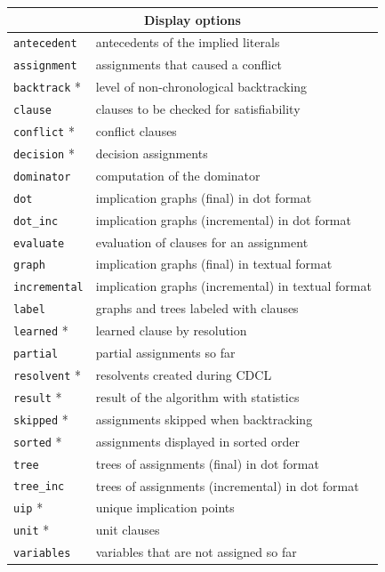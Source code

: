 \documentclass[11pt]{article}
\newcommand*{\p}[1]{\textup{\texttt{#1}}}
\begin{document}
\begin{center}
\begin{tabular}{|l|l|}
\hline
\multicolumn{2}{|c|}{\textbf{\large Display options}}\\
\hline
\p{antecedent}  &  antecedents of the implied literals\\
\p{assignment}  &  assignments that caused a conflict\\
\p{backtrack} * &  level of non-chronological backtracking\\
\p{clause}      &  clauses to be checked for satisfiability \\
\p{conflict} *  &  conflict clauses\\
\p{decision} *  &  decision assignments \\
\p{dominator}   &  computation of the dominator\\
\p{dot}         &  implication graphs (final) in dot format \\
\p{dot\_inc}    &  implication graphs (incremental) in dot format\\
\p{evaluate}    &  evaluation of clauses for an assignment\\
\p{graph}       &  implication graphs (final) in textual format \\
\p{incremental} &  implication graphs (incremental) in textual format\\
\p{label}       &  graphs and trees labeled with clauses\\
\p{learned} *   &  learned clause by resolution\\
\p{partial}     &  partial assignments so far \\
\p{resolvent} * &  resolvents created during CDCL \\
\p{result} *    &  result of the algorithm with statistics\\
\p{skipped} *   &  assignments skipped when backtracking \\
\p{sorted} *    &  assignments displayed in sorted order\\
\p{tree}        &  trees of assignments (final) in dot format\\
\p{tree\_inc}   &  trees of assignments (incremental) in dot format\\
\p{uip} *       &  unique implication points \\
\p{unit} *      &  unit clauses \\
\p{variables}   &  variables that are not assigned so far\\
\hline
\end{tabular}
\end{center}
\end{document}
